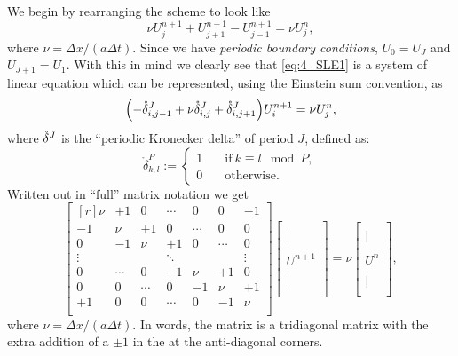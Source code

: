 \documentclass[11pt,letter, swedish, english
]{article}
\newcommand{\Dx}{\ensuremath{\Delta{x}}}
\newcommand{\Dt}{\ensuremath{\Delta{t}}}
\begin{document}
We begin by rearranging the scheme to look like
\begin{equation}\label{eq:4_SLE1}
\nu U_j^{n+1}+U_{j+1}^{n+1}-U_{j-1}^{n+1}=\nu U_j^n,
\end{equation}
where $\nu=\Dx/(a\Dt)$. 
Since we have \emph{periodic boundary conditions}\footnotemark{},
$U_0=U_J$ and $U_{J+1}=U_1$. With this in mind we clearly see that
\eqref{eq:4_SLE1} is a system of linear equation which can be
represented, using the Einstein sum convention, as
\begin{equation}
\qty(-{\mathring{\delta}^{J}_{i,j-1}}+\nu{\mathring{\delta}^{J}_{i, j}}+{\mathring{\delta}^{J}_{i, j+1}})U^{n+1}_i=\nu U_j^n,
\end{equation}
where ${\mathring{\delta}^{J}_{}}$ is the ``periodic Kronecker delta'' of period $J$,
defined as:
\begin{equation}
\mathring\delta^{P}_{k,l}:=
\begin{cases}
1\quad&\text{if}\ k\equiv l\mod P,\\
0&\text{otherwise}.
\end{cases}
\end{equation}
Written out in ``full'' matrix notation we get
\begin{equation}
\begin{bmatrix*}[r]
\nu&+1&0&\cdots&0&0&-1\\
-1&\nu&+1&0&\cdots&0&0\\
0&-1&\nu&+1&0&\cdots&0\\
\vdots&&&\ddots&&&\vdots\\
0&\cdots&0&-1&\nu&+1&0\\
0&0&\cdots&0&-1&\nu&+1\\
+1&0&0&\cdots&0&-1&\nu\\
\end{bmatrix*}
\begin{bmatrix*}
{}\\|\;\\{}\\U^{n+1}\\{}\\|\;\\{}
\end{bmatrix*}
=\nu
\begin{bmatrix*}
{}\\|\\{}\\U^{n}\\{}\\|\\{}
\end{bmatrix*},
\end{equation}
where $\nu=\Dx/(a\Dt)$. In words, the matrix is a tridiagonal matrix
with the extra addition of a $\pm1$ in the at the anti-diagonal
corners. 


\end{document}
